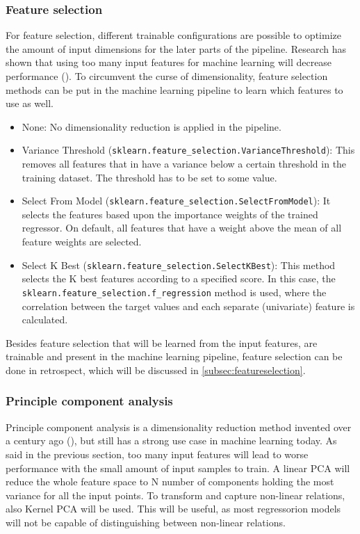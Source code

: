 \subsubsection{Feature selection}
For feature selection, different trainable configurations are possible to optimize the amount of input dimensions for the later parts of the pipeline. Research has shown that using too many input features for machine learning will decrease performance (\cite{Trunk1979-sq}). To circumvent the curse of dimensionality, feature selection methods can be put in the machine learning pipeline to learn which features to use as well. 

\begin{itemize}
	\item None: No dimensionality reduction is applied in the pipeline.
	\item Variance Threshold (\verb|sklearn.feature_selection.VarianceThreshold|): This removes all features that in have a variance below a certain threshold in the training dataset. The threshold has to be set to some value.
	\item Select From Model (\verb|sklearn.feature_selection.SelectFromModel|): It selects the features based upon the importance weights of the trained regressor. On default, all features that have a weight above the mean of all feature weights are selected.
	\item Select K Best (\verb|sklearn.feature_selection.SelectKBest|): This method selects the K best features according to a specified score. In this case, the \\\verb|sklearn.feature_selection.f_regression| method is used, where the correlation between the target values and each separate (univariate) feature is calculated.
\end{itemize}

Besides feature selection that will be learned from the input features, are trainable and present in the machine learning pipeline, feature selection can be done in retrospect, which will be discussed in \autoref{subsec:featureselection}.

\subsubsection{Principle component analysis}
Principle component analysis is a dimensionality reduction method invented over a century ago (\cite{Pearson1901-de}), but still has a strong use case in machine learning today. As said in the previous section, too many input features will lead to worse performance with the small amount of input samples to train. A linear PCA will reduce the whole feature space to N number of components holding the most variance for all the input points. To transform and capture non-linear relations, also Kernel PCA will be used. This will be useful, as most regressorion models will not be capable of distinguishing between non-linear relations.

